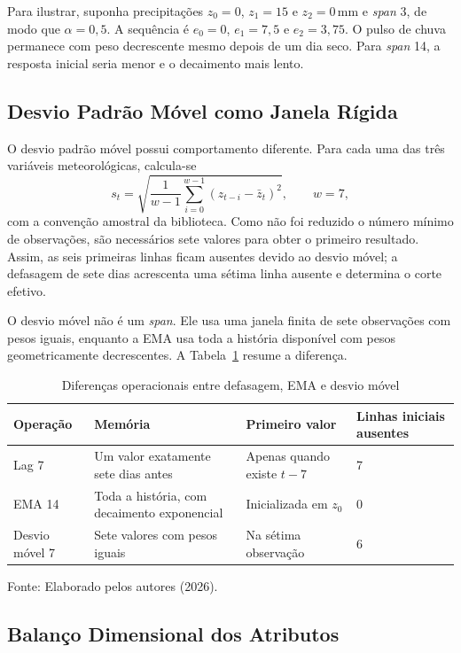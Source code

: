 Para ilustrar, suponha precipitações $z_0=0$, $z_1=15$ e $z_2=0\,\mathrm{mm}$ e \textit{span} 3, de modo que $\alpha=0{,}5$. A sequência é $e_0=0$, $e_1=7{,}5$ e $e_2=3{,}75$. O pulso de chuva permanece com peso decrescente mesmo depois de um dia seco. Para \textit{span} 14, a resposta inicial seria menor e o decaimento mais lento.

\subsection{Desvio Padrão Móvel como Janela Rígida}

O desvio padrão móvel possui comportamento diferente. Para cada uma das três variáveis meteorológicas, calcula-se
\begin{equation}
    s_t=\sqrt{\frac{1}{w-1}\sum_{i=0}^{w-1}
    (z_{t-i}-\bar{z}_t)^2}, \qquad w=7,
\end{equation}
com a convenção amostral da biblioteca. Como não foi reduzido o número mínimo de observações, são necessários sete valores para obter o primeiro resultado. Assim, as seis primeiras linhas ficam ausentes devido ao desvio móvel; a defasagem de sete dias acrescenta uma sétima linha ausente e determina o corte efetivo.

O desvio móvel não é um \textit{span}. Ele usa uma janela finita de sete observações com pesos iguais, enquanto a EMA usa toda a história disponível com pesos geometricamente decrescentes. A Tabela~\ref{tab:ema_std_lag} resume a diferença.

\begin{table}[H]
\centering
\caption{Diferenças operacionais entre defasagem, EMA e desvio móvel}
\label{tab:ema_std_lag}
\small
\begin{tabularx}{\textwidth}{p{2.8cm} X X p{2.6cm}}
\toprule
\textbf{Operação} & \textbf{Memória} & \textbf{Primeiro valor} & \textbf{Linhas iniciais ausentes} \\
\midrule
Lag 7 & Um valor exatamente sete dias antes & Apenas quando existe $t-7$ & 7 \\
EMA 14 & Toda a história, com decaimento exponencial & Inicializada em $z_0$ & 0 \\
Desvio móvel 7 & Sete valores com pesos iguais & Na sétima observação & 6 \\
\bottomrule
\end{tabularx}
\small{Fonte: Elaborado pelos autores (2026).}
\end{table}

\subsection{Balanço Dimensional dos Atributos}

